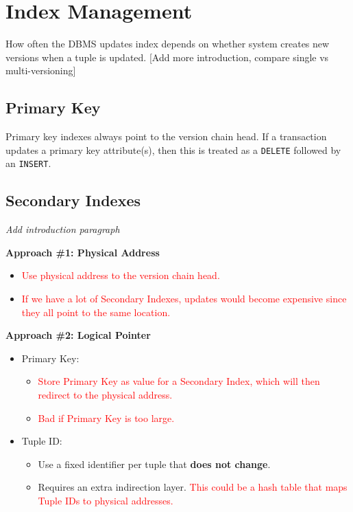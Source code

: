 \documentclass[11pt]{article}
\newcommand{\rr}[1]{\textcolor{red}{#1}}
\begin{document}
\section{Index Management}
How often the DBMS updates index depends on whether system creates new versions when a tuple is updated. [Add more introduction, compare single vs multi-versioning]

\subsection*{Primary Key}
Primary key indexes always point to the version chain head.
If a transaction updates a primary key attribute(s), then this is treated as a \texttt{DELETE} 
followed by an \texttt{INSERT}.

\subsection*{Secondary Indexes}
\textit{Add introduction paragraph}        

\textbf{Approach \#1: Physical Address}
\begin{itemize}
    \item \rr{Use physical address to the version chain head.} 
    \item \rr{If we have a lot of Secondary Indexes, updates would become expensive since they all point to the same location.}
\end{itemize}

\textbf{Approach \#2: Logical Pointer}
\begin{itemize}
    \item Primary Key: 
    \begin{itemize}
    \item \rr{Store Primary Key as value for a Secondary Index, which will then redirect to the physical address.}
    \item \rr{Bad if Primary Key is too large.}
    \end{itemize}
    \item Tuple ID:
    \begin{itemize}
    \item Use a fixed identifier per tuple that \textbf{does not change}.
    \item Requires an extra indirection layer. \rr{This could be a hash table that maps Tuple IDs to physical addresses.}
\end{itemize}
\end{itemize}

\newpage


\end{document}
